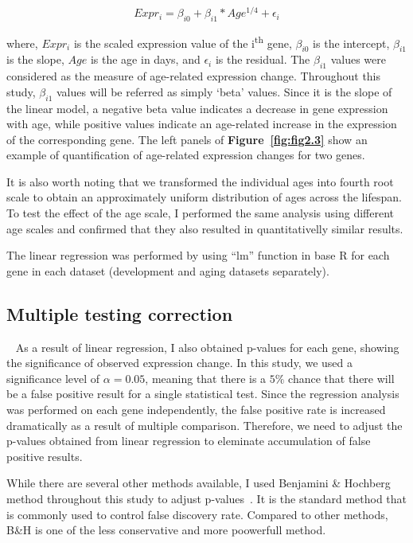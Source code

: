 \begin{equation}
    Expr_i = \beta_{i0} + \beta_{i1} * Age^{1/4} + \epsilon_i
    \label{eq:exp_change}
\end{equation}

where, $Expr_i$ is the scaled expression value of the i\textsuperscript{th} gene, $\beta_{i0}$ is the intercept, $\beta_{i1}$ is the slope, $Age$ is the age in days, and $\epsilon_i$ is the residual.
The $\beta_{i1}$ values were considered as the measure of age-related expression change. Throughout this study, $\beta_{i1}$ values will be referred as simply `beta' values.
Since it is the slope of the linear model, a negative beta value indicates a decrease in gene expression with age, while positive values indicate an age-related increase in the expression of the corresponding gene. 
The left panels of \textbf{Figure~\ref{fig:fig2.3}} show an example of quantification of age-related expression changes for two genes.

It is also worth noting that we transformed the individual ages into fourth root scale to obtain an approximately uniform distribution of ages across the lifespan.
To test the effect of the age scale, I performed the same analysis using different age scales and confirmed that they also resulted in quantitativelly similar results.

The linear regression was performed by using ``lm'' function in base R for each gene in each dataset (development and aging datasets separately).

\subsection{Multiple testing correction}~\label{subsec:p.adjust}
As a result of linear regression, I also obtained p-values for each gene, showing the significance of observed expression change.
In this study, we used a significance level of $\alpha = 0.05$, meaning that there is a $5\%$ chance that there will be a false positive result for a single statistical test.
Since the regression analysis was performed on each gene independently, the false positive rate is increased dramatically as a result of multiple comparison.
Therefore, we need to adjust the p-values obtained from linear regression to eleminate accumulation of false positive results.

While there are several other methods available, I used Benjamini {\&} Hochberg method throughout this study to adjust p-values~\cite{Benjamini1995}.
It is the standard method that is commonly used to control false discovery rate. 
Compared to other methods, B{\&}H is one of the less conservative and more poowerfull method.

